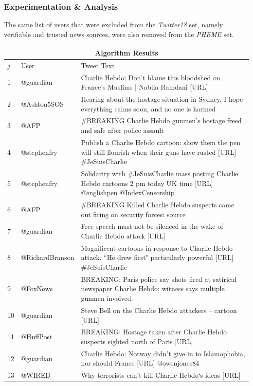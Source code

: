 \documentclass[preprint,review,12pt]{elsarticle}
\begin{document}
\subsubsection{Experimentation & Analysis}
The same list of users that were excluded from the \textit{Twitter18} set, namely verifiable and trusted news sources, were also removed from the \textit{PHEME} set.

\begin{longtable}{ |p{0.5cm}|p{4.1cm}|p{12cm}|  }
\hline
\multicolumn{3}{|c|}{Algorithm Results} \\
\hline
$j$ & User & Tweet Text \\
\hline
1 & @guardian & Charlie Hebdo: Don’t blame this bloodshed on France’s Muslims | Nabila Ramdani [URL]\\
\hline
2 & @Ashton5SOS & Hearing about the hostage situation in Sydney, I hope everything calms soon, and no one is harmed\\
\hline
3 & @AFP & #BREAKING Charlie Hebdo gunmen's hostage freed and safe after police assault\\
\hline
4 & @stephenfry & Publish a Charlie Hebdo cartoon: show them the pen will still flourish when their guns have rusted [URL] \#JeSuisCharlie\\
\hline
5 & @stephenfry & Solidarity with \#JeSuisCharlie mass posting Charlie Hebdo cartoons 2 pm today UK time [URL] @englishpen @IndexCensorship \\
\hline
6 & @AFP & \#BREAKING Killed Charlie Hebdo suspects came out firing on security forces: source \\
\hline
7 & @guardian & Free speech must not be silenced in the wake of Charlie Hebdo attack [URL] \\
\hline
8 & @RichardBranson & Magnificent cartoons in response to Charlie Hebdo attack. ``He drew first" particularly powerful [URL] \#JeSuisCharlie \\
\hline
9 & @FoxNews & BREAKING: Paris police say shots fired at satirical newspaper Charlie Hebdo; witness says multiple gunmen involved. \\
\hline
10 & @guardian & Steve Bell on the Charlie Hebdo attackers – cartoon [URL] \\
\hline
11 & @HuffPost & BREAKING: Hostage taken after Charlie Hebdo suspects sighted north of Paris [URL] \\
\hline
12 & @guardian & Charlie Hebdo: Norway didn’t give in to Islamophobia, nor should France [URL] @owenjones84\\
\hline
13 & @WIRED & Why terrorists can't kill Charlie Hebdo‘s ideas [URL]\\

\end{longtable}
\end{document}
